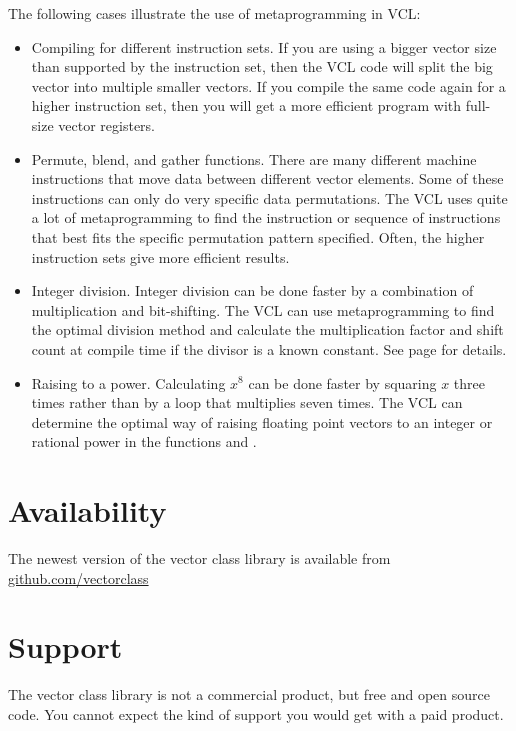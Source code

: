 \documentclass[vcl_manual.tex]{subfiles}
\begin{document}
The following cases illustrate the use of metaprogramming in VCL:
\begin{itemize}
\item Compiling for different instruction sets. If you are using a bigger vector size than supported by the instruction set, then the VCL code will split the big vector into multiple smaller vectors. If you compile the same code again for a higher instruction set, then you will get a more efficient program with full-size vector registers.

\item Permute, blend, and gather functions. There are many different machine instructions that move data between different vector elements. Some of these instructions can only do very specific data permutations. The VCL uses quite a lot of metaprogramming to find the instruction or sequence of instructions that best fits the specific permutation pattern specified. Often, the higher instruction sets give more efficient results.

\item Integer division. Integer division can be done faster by a combination of multiplication and bit-shifting. The VCL can use metaprogramming to find the optimal division method and calculate the multiplication factor and shift count at compile time if the divisor is a known constant. 
See page \pageref{HowVCLUsesMetaprogramming} for details.

\item Raising to a power. Calculating $x^8$ can be done faster by squaring $x$ three times rather than by a loop that multiplies seven times. The VCL can determine the optimal way of raising floating point vectors to an integer or rational power in the functions  and .
\end{itemize}

\section{Availability} \label{Availability}
The newest version of the vector class library is available from 
\href{https://github.com/vectorclass}{github.com/vectorclass}


\section{Support} \label{Support}
The vector class library is not a commercial product, but free and open source code. 
You cannot expect the kind of support you would get with a paid product. 
\end{document}
